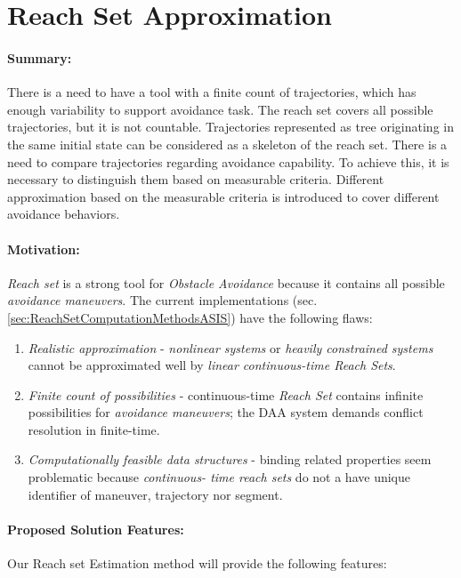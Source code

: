 \cleardoublepage
\section{Reach Set Approximation}\label{s:reachSet}
\paragraph{Summary:} There is a need to have a tool with a finite count of trajectories, which has enough variability to support avoidance task. The reach set covers all possible trajectories, but it is not countable. Trajectories represented as tree originating in the same initial state can be considered as a skeleton of the reach set. There is a need to compare trajectories regarding avoidance capability. To achieve this, it is necessary to distinguish them based on measurable criteria. Different approximation based on the measurable criteria is introduced to cover different avoidance behaviors. 

    \noindent\paragraph{Motivation:} \emph{Reach set} is a strong tool for \emph{Obstacle Avoidance} because it contains all possible \emph{avoidance maneuvers}. The current implementations (sec. \ref{sec:ReachSetComputationMethodsASIS}) have the following flaws:
    
    \begin{enumerate}
        \item \emph{Realistic approximation} - \emph{nonlinear systems} or \emph{heavily constrained systems} cannot be approximated well by \emph{linear continuous-time Reach Sets}.
        
        \item \emph{Finite count of possibilities} - continuous-time \emph{Reach Set} contains  infinite possibilities for \emph{avoidance maneuvers}; the DAA system demands conflict resolution in finite-time.
        
        \item \emph{Computationally feasible data structures} - binding related properties seem problematic because \emph{continuous- time reach sets} do not a have unique identifier of maneuver, trajectory nor segment. 
    \end{enumerate}
    
    \paragraph{Proposed Solution Features:} Our Reach set Estimation method will provide the following features:
    

